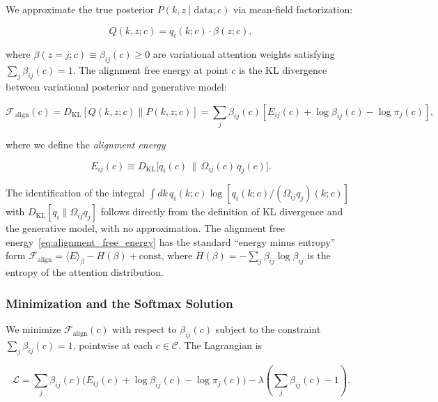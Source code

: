 \documentclass[11pt]{article}
\begin{document}
We approximate the true posterior $P(k, z \mid \text{data}; c)$ via mean-field factorization:

\begin{equation}
Q(k, z; c) = q_i(k; c) \cdot \beta(z; c),
\end{equation}

where $\beta(z{=}j; c) \equiv \beta_{ij}(c) \geq 0$ are variational attention weights satisfying $\sum_j \beta_{ij}(c) = 1$. The alignment free energy at point $c$ is the KL divergence between variational posterior and generative model:

\begin{equation}
\mathcal{F}_{\text{align}}(c) = D_{\mathrm{KL}}[Q(k,z; c) \| P(k,z; c)] = \sum_j \beta_{ij}(c) \left[ E_{ij}(c) + \log \beta_{ij}(c) - \log \pi_j(c) \right],
\label{eq:alignment_free_energy}
\end{equation}

where we define the \emph{alignment energy}

\begin{equation}
E_{ij}(c) \equiv D_{\mathrm{KL}}\!\big[q_i(c) \,\big\|\, \Omega_{ij}(c)\,q_j(c)\big].
\label{eq:alignment_energy}
\end{equation}

The identification of the integral $\int dk\, q_i(k;c) \log [q_i(k;c) / (\Omega_{ij}q_j)(k;c)]$ with $D_{\mathrm{KL}}[q_i \| \Omega_{ij}q_j]$ follows directly from the definition of KL divergence and the generative model, with no approximation. The alignment free energy~\eqref{eq:alignment_free_energy} has the standard ``energy minus entropy'' form $\mathcal{F}_{\text{align}} = \langle E \rangle_\beta - H(\beta) + \text{const}$, where $H(\beta) = -\sum_j \beta_{ij} \log \beta_{ij}$ is the entropy of the attention distribution.

\subsubsection{Minimization and the Softmax Solution}

We minimize $\mathcal{F}_{\text{align}}(c)$ with respect to $\beta_{ij}(c)$ subject to the constraint $\sum_j \beta_{ij}(c) = 1$, pointwise at each $c \in \mathcal{C}$. The Lagrangian is

\begin{equation}
\mathcal{L} = \sum_j \beta_{ij}(c)\big(E_{ij}(c) + \log \beta_{ij}(c) - \log \pi_j(c)\big) - \lambda\!\left(\sum_j \beta_{ij}(c) - 1\right).
\end{equation}
\end{document}
